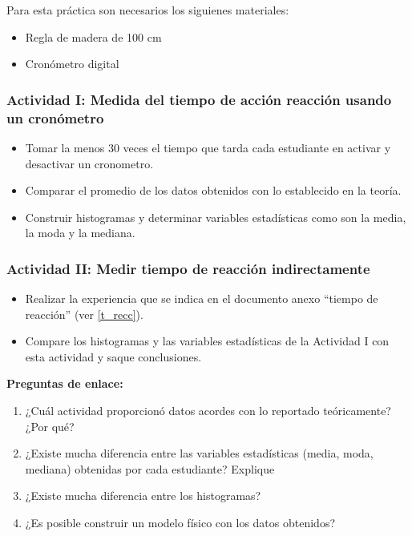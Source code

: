 \documentclass[12pt]{article}
\begin{document}
Para esta práctica son necesarios los siguienes materiales:
\begin{itemize}
    \item Regla de madera de 100 cm
    \item Cronómetro digital
\end{itemize}

\subsubsection{Actividad I: Medida del tiempo de acción reacción usando un cronómetro}

\begin{itemize}
    \item Tomar la menos 30 veces el tiempo que tarda cada estudiante en activar y desactivar un cronometro.
    \item Comparar el promedio de los datos obtenidos con lo establecido en la teoría.
    \item Construir histogramas y determinar variables estadísticas como son la media, la moda y la mediana.
\end{itemize}

\subsubsection{Actividad II: Medir tiempo de reacción indirectamente}

\begin{itemize}
    \item Realizar la experiencia que se indica en el documento anexo “tiempo de reacción” (ver \ref{t_recc}).
    \item Compare los histogramas y las variables estadísticas de la Actividad I con esta actividad y saque conclusiones.
\end{itemize}

\textbf{Preguntas de enlace:}
\begin{enumerate}
    \item ¿Cuál actividad proporcionó datos acordes con lo reportado teóricamente? ¿Por qué?
    \item ¿Existe mucha diferencia entre las variables estadísticas (media, moda, mediana) obtenidas por cada estudiante? Explique
    \item ¿Existe mucha diferencia entre los histogramas?
    \item ¿Es posible construir un modelo físico con los datos obtenidos?
\end{enumerate}
\end{document}
